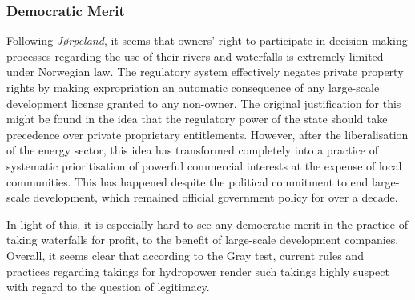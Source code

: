 \subsubsection{Democratic Merit}

Following \emph{Jørpeland}, it seems that owners' right to participate in decision-making processes regarding the use of their rivers and waterfalls is extremely limited under Norwegian law. The regulatory system effectively negates private property rights by making expropriation an automatic consequence of any large-scale development license granted to any non-owner. The original justification for this might be found in the idea that the regulatory power of the state should take precedence over private proprietary entitlements. However, after the liberalisation of the energy sector, this idea has transformed completely into a practice of systematic prioritisation of powerful commercial interests at the expense of local communities. This has happened despite the political commitment to end large-scale development, which remained official government policy for over a decade.

In light of this, it is especially hard to see any democratic merit in the practice of taking waterfalls for profit, to the benefit of large-scale development companies. Overall, it seems clear that according to the Gray test, current rules and practices regarding takings for hydropower render such takings highly suspect with regard to the question of legitimacy.




